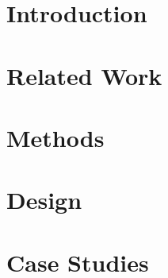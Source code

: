 {%






\section{Introduction}\label{sec:intro}

\section{Related Work}\label{sec:relworks}

\section{Methods}\label{sec:methods}

\section{Design}\label{sec:design}

\section{Case Studies}\label{sec:cases}

}
